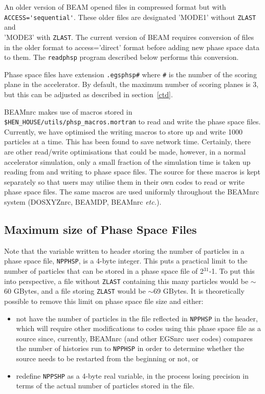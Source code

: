 \documentclass[12pt,twoside]{article}
\newcommand{\etc}{{\em etc.}}
\begin{document}
An older version of BEAM opened files in compressed format but with\\
\verb+ACCESS='sequential'+.  These older files are designated 'MODE1' without
\verb+ZLAST+ and\\ 'MODE3' with \verb+ZLAST+.  The current version of BEAM requires
conversion of files in the older format to access='direct' format before adding
new phase space data to them.  The \verb+readphsp+ program described below
performs this conversion.

Phase space files have extension \verb+.egsphsp#+ where \verb+#+
is the number of the scoring plane in the accelerator.  By default, the
maximum number of scoring planes is 3, but this can be adjusted as
described in section~\ref{ctd}.

BEAMnrc makes use of macros stored in
{\tt \$HEN\_HOUSE/utils/phsp\_macros.mortran} to read and
write the phase space files.  Currently, we have optimised the
writing macros to store up and write 1000 particles at a time.  This has
been found to save network time.  Certainly, there are other read/write
optimisations that could be made, however, in a normal accelerator simulation,
only a small fraction of the simulation time is taken up reading from and
writing to phase space files.
The source for these macros is kept separately so that users may
utilise them in their own codes to read or write phase space files.
The same macros are used uniformly throughout the
BEAMnrc system (DOSXYZnrc, BEAMDP, BEAMnrc \etc).

\subsection{Maximum size of Phase Space Files}
Note that the variable written to header storing the number of particles
in a phase space file, {\tt NPPHSP}, is a 4-byte integer.  This puts a
practical limit to the number of particles that can be stored in
a phase space file of 2$^{31}$-1.  To put this into perspective, a file
without {\tt ZLAST} containing this many particles would be $\sim$60 GBytes,
and a file storing {\tt ZLAST} would be $\sim$69 GBytes.  It is theoretically
possible to remove this limit on phase space file size and either:
\begin{itemize}
\item not have the number of particles in the file reflected in {\tt NPPHSP} in
the header, which will require other modifications to codes using this phase space
file as a source since, currently, BEAMnrc (and other EGSnrc user codes) compares
the number of histories run to {\tt NPPHSP} in order to determine whether the
source needs to be restarted from the beginning or not, or
\item redefine {\tt NPPSHP} as a 4-byte real variable, in the process losing
precision in terms of the actual number of particles stored in the file.
\end{itemize}
\end{document}
